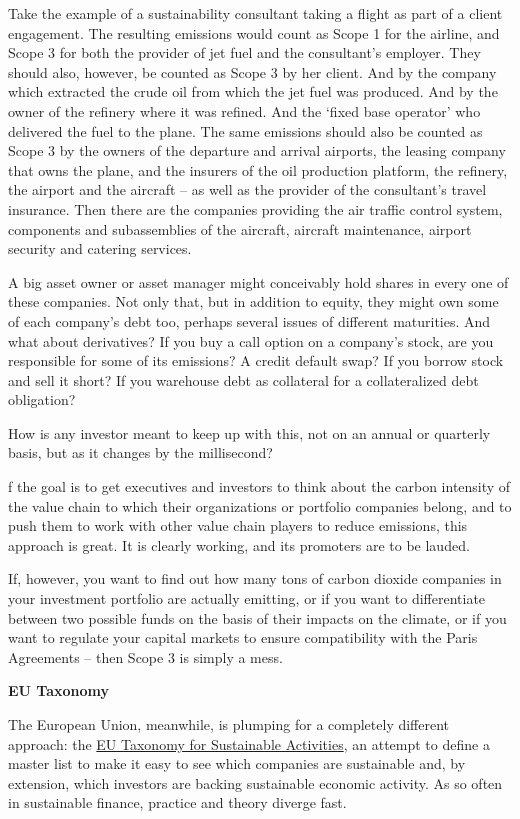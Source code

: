 \documentclass[
]{book}
\begin{document}
Take the example of a sustainability consultant taking a flight as part of a client engagement. The resulting emissions would count as Scope 1 for the airline, and Scope 3 for both the provider of jet fuel and the consultant's employer. They should also, however, be counted as Scope 3 by her client. And by the company which extracted the crude oil from which the jet fuel was produced. And by the owner of the refinery where it was refined. And the `fixed base operator' who delivered the fuel to the plane. The same emissions should also be counted as Scope 3 by the owners of the departure and arrival airports, the leasing company that owns the plane, and the insurers of the oil production platform, the refinery, the airport and the aircraft -- as well as the provider of the consultant's travel insurance. Then there are the companies providing the air traffic control system, components and subassemblies of the aircraft, aircraft maintenance, airport security and catering services.

A big asset owner or asset manager might conceivably hold shares in every one of these companies. Not only that, but in addition to equity, they might own some of each company's debt too, perhaps several issues of different maturities. And what about derivatives? If you buy a call option on a company's stock, are you responsible for some of its emissions? A credit default swap? If you borrow stock and sell it short? If you warehouse debt as collateral for a collateralized debt obligation?

How is any investor meant to keep up with this, not on an annual or quarterly basis, but as it changes by the millisecond?

f the goal is to get executives and investors to think about the carbon intensity of the value chain to which their organizations or portfolio companies belong, and to push them to work with other value chain players to reduce emissions, this approach is great. It is clearly working, and its promoters are to be lauded.

If, however, you want to find out how many tons of carbon dioxide companies in your investment portfolio are actually emitting, or if you want to differentiate between two possible funds on the basis of their impacts on the climate, or if you want to regulate your capital markets to ensure compatibility with the Paris Agreements -- then Scope 3 is simply a mess.

\textbf{EU Taxonomy}

The European Union, meanwhile, is plumping for a completely different approach: the \href{https://ec.europa.eu/info/business-economy-euro/banking-and-finance/sustainable-finance/eu-taxonomy-sustainable-activities_en}{EU Taxonomy for Sustainable Activities}, an attempt to define a master list to make it easy to see which companies are sustainable and, by extension, which investors are backing sustainable economic activity. As so often in sustainable finance, practice and theory diverge fast.
\end{document}
